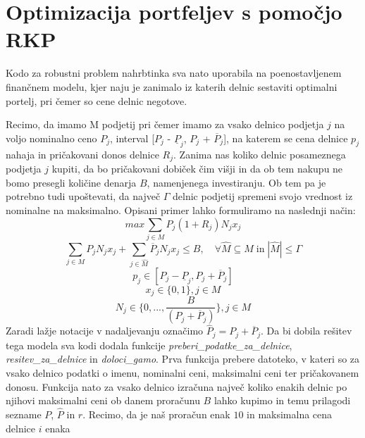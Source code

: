 \documentclass[a4paper,12pt]{article}
\theoremstyle{definition}
\begin{document}
\section{Optimizacija portfeljev s pomočjo RKP}
\medskip
Kodo za robustni problem nahrbtinka sva nato uporabila na poenostavljenem finančnem modelu,
kjer naju je zanimalo iz katerih delnic sestaviti optimalni portelj, pri čemer so cene delnic
negotove. 
\par
Recimo, da imamo M podjetij pri čemer imamo za vsako delnico podjetja $j$ na voljo nominalno ceno $P_j$,
interval [$P_j$ - $\underline{P}_{j}$, $P_j$ + $\overline{P}_{j}$], na katerem se cena delnice $p_j$  
nahaja in pričakovani donos delnice $R_j$. Zanima 
nas koliko delnic posameznega podjetja $j$ kupiti, da bo pričakovani dobiček čim višji in da ob tem nakupu
ne bomo presegli količine denarja $B$, namenjenega investiranju. Ob tem pa je potrebno tudi upoštevati,
da največ $\Gamma$ delnic podjetij spremeni svojo vrednost iz nominalne na maksimalno. Opisani primer lahko
formuliramo na naslednji način:
\begin{equation}
\tag*{}
     max \sum_{j \in M} P_{j}(1 + R_{j})N_{j}x_{j}
\end{equation}
\begin{equation}
\tag*{}
    \sum_{j \in M}P_{j}N_{j}x_{j} + \sum_{j \in \hat{M}}\overline{P}_{j}N_{j}x_{j} \leq B,\quad \forall \hat{M} \subseteq M \; \text{in}\; |\hat{M}| \leq \Gamma    
\end{equation}
\begin{equation}
\tag*{}
    p_{j} \in [P_{j} - \underline{P}_{j}, P_{j} + \overline{P}_{j}]
\end{equation}
\begin{equation}
\tag*{}
    x_{j} \in \{0,1\}, j \in M
\end{equation}
\begin{equation}
    \tag*{}
    N_j \in \{0, ..., \frac{B}{(P_j + \overline{P}_{j})} \}, j \in M
\end{equation}
Zaradi lažje notacije v nadaljevanju označimo $\hat{P}_j = P_j + \overline{P}_j$.
Da bi dobila rešitev tega modela sva kodi dodala
funkcije \textit{preberi\_podatke\_za\_delnice},
\textit{resitev\_za\_delnice} in \textit{doloci\_gamo}. Prva funkcija prebere
datoteko, v kateri so za vsako delnico podatki o imenu,
nominalni ceni, maksimalni ceni ter pričakovanem donosu.
Funkcija nato za vsako delnico izračuna največ koliko enakih
delnic po njihovi maksimalni ceni ob danem proračunu $B$ lahko kupimo in temu prilagodi sezname $P$,
$\hat{P}$ in $r$. Recimo, da je naš proračun enak $10$ in maksimalna cena delnice $i$ enaka
\end{document}
